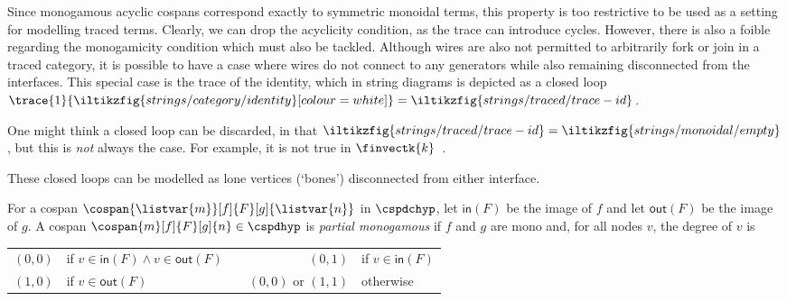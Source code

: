 Since monogamous acyclic cospans correspond exactly to symmetric monoidal terms,
this property is too restrictive to be used as a setting for modelling traced
terms.
Clearly, we can drop the acyclicity condition, as the trace can introduce
cycles.
However, there is also a foible regarding the monogamicity condition which must
also be tackled.
Although wires are also not permitted to arbitrarily fork or join in a traced
category, it is possible to have a case where wires do not connect to
any generators while also remaining disconnected from the interfaces.
This special case is the trace of the identity, which in string diagrams is
depicted as a closed
loop \(
    \trace{1}{\iltikzfig{strings/category/identity}[colour=white]}
    =
    \iltikzfig{strings/traced/trace-id}
\).

\begin{remark}
    One might think a closed loop can be discarded, in that \(
        \iltikzfig{strings/traced/trace-id}
        =
        \iltikzfig{strings/monoidal/empty}
    \), but this is \emph{not} always the case.
    For example, it is not true in
    \(\finvectk{k}\)~\cite[Sec. 6.1]{hasegawa1997recursion}.
\end{remark}

These closed loops can be modelled as lone vertices (`bones') disconnected from
either interface.

\begin{definition}
    For a cospan \(\cospan{\listvar{m}}[f]{F}[g]{\listvar{n}}\) in
    \(\cspdchyp\), let \(\mathsf{in}(F)\) be the image of \(f\) and let
    \(\mathsf{out}(F)\) be the image of \(g\).
    A cospan \(\cospan{m}[f]{F}[g]{n} \in \cspdhyp\) is
    \emph{partial monogamous} if \(f\) and \(g\) are mono and, for all nodes
    \(v\), the degree of \(v\) is
    \begin{center}
        \begin{tabular}{rlcrl}
            \((0,0)\)
            &
            if \(v \in \mathsf{in}(F) \wedge v \in \mathsf{out}(F)\)
            &
            \quad
            &
            \((0,1)\)
            &
            if \(v \in \mathsf{in}(F)\)
            \\
            \((1,0)\)
            &
            if \(v \in \mathsf{out}(F)\)
            &
            \quad
            &
            \((0,0)\)
            or \((1,1)\)
            &
            otherwise
        \end{tabular}
    \end{center}
\end{definition}

